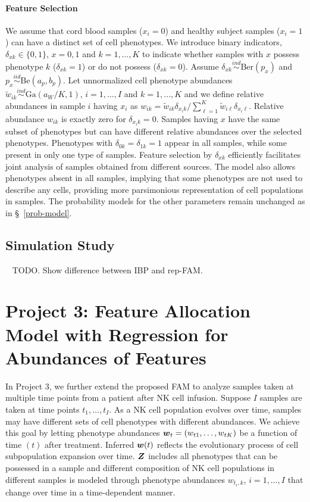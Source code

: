 \documentclass[12pt,]{article}
\newcommand{\iid}{\overset{iid}{\sim}}
\newcommand{\ind}{\overset{ind}{\sim}}
\def\G{\text{Ga}}
\def\Ber{\text{Ber}}
\def\Be{\text{Be}}
\newcommand{\bZ}{\mbox{\boldmath $Z$}}
\newcommand{\bw}{\mbox{\boldmath $w$}}
\begin{document}
\paragraph*{Feature Selection} We assume that cord blood samples ($x_i=0$) and
healthy subject samples ($x_i=1$) can have a distinct set of cell phenotypes.
We introduce binary indicators, $\delta_{xk}\in \{0, 1\}$, $x=0,1$ and
$k=1,\ldots, K$ to indicate whether samples with $x$ possess  phenotype $k$
($\delta_{xk}=1$) or do not possess ($\delta_{xk}=0$). Assume $\delta_{xk} \ind
\Ber(p_{x})$ and $p_x \iid \Be(a_p, b_p)$.  Let unnormalized cell phenotype
abundances $\tilde w_{ik} \ind \G(a_W/K, 1)$, $i=1, \ldots, I$ and $k=1,
\ldots, K$ and we define relative abundances in sample $i$ having $x_i$ as 
$
w_{ik} =\tilde w_{ik} \delta_{x_i k}/\sum_{\ell=1}^K\tilde w_{i\ell} \delta_{x_i \ell}.
$
Relative abundance $w_{ik}$ is exactly zero for $\delta_{x_ik}=0$. Samples
having $x$ have the same subset of phenotypes but can have different relative
abundances over the selected phenotypes. Phenotypes with
$\delta_{0k}=\delta_{1k}=1$ appear in all samples, while some present in only
one type of samples.   Feature selection by $\delta_{xk}$ efficiently
facilitates joint analysis of samples obtained from different sources. The
model also allows phenotypes absent in all samples, implying that some
phenotypes are not used to describe any cells, providing more parsimonious
representation of cell populations in samples. The probability models for the
other parameters remain unchanged as in \S~\ref{prob-model}.  



\subsection{Simulation Study}~\label{sec:rep-sim}
TODO. Show difference between IBP and rep-FAM.


\section{Project 3: Feature Allocation Model with Regression for Abundances of Features}\label{sec:proj3}
In Project 3, we further extend the proposed FAM to analyze samples taken at
multiple time points from a patient after NK cell infusion. Suppose $I$ samples
are taken at time points $t_1, \ldots, t_I$.   As a NK cell population evolves
over time, samples may have different sets of cell phenotypes with different
abundances.    We achieve this goal by letting phenotype abundances
$\bw_{t}=(w_{t1}, \ldots, w_{tK})$ be a function of time $(t)$ after treatment.
Inferred $\bw(t)$ reflects the evolutionary process of cell subpopulation
expansion over time.   $\bZ$ includes all phenotypes that can be possessed in a
sample and different composition of NK cell populations in different samples is
modeled through  phenotype abundances $w_{t_i, k}$, $i=1, \ldots, I$ that
change over time in a time-dependent manner.
\end{document}
